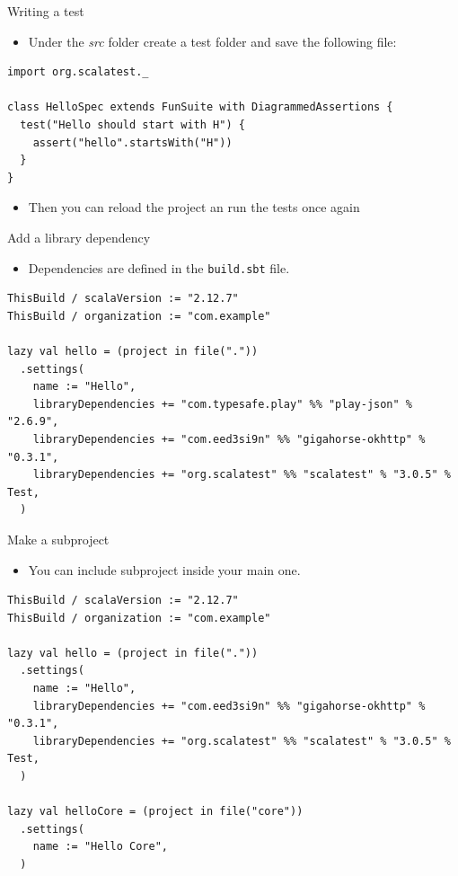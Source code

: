 \documentclass[presentation, aspectratio=169]{beamer}
\begin{document}
\begin{frame}[label={sec:org71e909d},fragile]{Writing a test}
 \begin{itemize}
\item Under the \emph{src} folder create a test folder and save the following file:
\end{itemize}
\tiny
\begin{verbatim}
import org.scalatest._

class HelloSpec extends FunSuite with DiagrammedAssertions {
  test("Hello should start with H") {
    assert("hello".startsWith("H"))
  }
}
\end{verbatim}
\large
\begin{itemize}
\item Then you can reload the project an run the tests once again
\end{itemize}
\end{frame}
\begin{frame}[label={sec:orgba817a0},fragile]{Add a library dependency}
 \begin{itemize}
\item Dependencies are defined in the \texttt{build.sbt}  file.
\end{itemize}
\tiny
\begin{verbatim}
ThisBuild / scalaVersion := "2.12.7"
ThisBuild / organization := "com.example"

lazy val hello = (project in file("."))
  .settings(
    name := "Hello",
    libraryDependencies += "com.typesafe.play" %% "play-json" % "2.6.9",
    libraryDependencies += "com.eed3si9n" %% "gigahorse-okhttp" % "0.3.1",
    libraryDependencies += "org.scalatest" %% "scalatest" % "3.0.5" % Test,
  )
\end{verbatim}
\end{frame}

\begin{frame}[label={sec:orgdd9f51d},fragile]{Make a subproject}
 \begin{itemize}
\item You can include subproject inside your main one.
\end{itemize}
\tiny
\begin{verbatim}
ThisBuild / scalaVersion := "2.12.7"
ThisBuild / organization := "com.example"

lazy val hello = (project in file("."))
  .settings(
    name := "Hello",
    libraryDependencies += "com.eed3si9n" %% "gigahorse-okhttp" % "0.3.1",
    libraryDependencies += "org.scalatest" %% "scalatest" % "3.0.5" % Test,
  )

lazy val helloCore = (project in file("core"))
  .settings(
    name := "Hello Core",
  )

\end{verbatim}
\end{frame}
\end{document}
